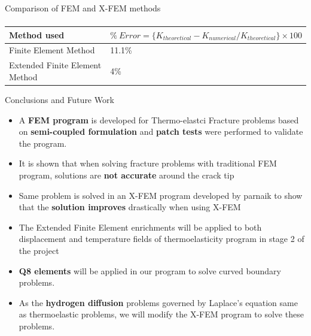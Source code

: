 \documentclass{beamer}
\begin{document}
\begin{frame}[t,fragile]{Comparison of FEM and X-FEM methods}
\begin{align*}
\end{align*}
\vspace{-28pt}
\bgroup
\def\arraystretch{2}  
\begin{table}[H]
    \centering
    \begin{tabular}{|C{3cm}|C{6cm}|}
\hline 
Method used& $\% \ Error= \{K_{theoretical}-K_{numerical}/K_{theoretical}\}\times 100$\\
\hline
 Finite Element Method & 11.1\%\\
\hline
 Extended Finite Element Method& 4\%\\
\hline
\end{tabular}
\label{table1}
\end{table}
\egroup
\end{frame} 
\begin{frame}[t,fragile]{Conclusions and Future Work}
    \vspace{-.2cm}
    \footnotesize
\begin{itemize}
         \item A \textbf{FEM program} is developed for Thermo-elastci Fracture problems based on \textbf{semi-coupled formulation} and \textbf{patch tests} were performed to validate the program.
       \item It is shown that when solving fracture problems with traditional FEM program, solutions are \textbf{not accurate} around the crack tip
        \item Same problem is solved in an X-FEM program developed by parnaik to show that the \textbf{solution improves} drastically when using X-FEM
       \item The Extended Finite Element enrichments will be applied to both displacement and temperature fields of thermoelasticity program in stage 2 of the project  
        \item \textbf{Q8 elements} will be applied in our program to solve curved boundary problems. 
        \item As the \textbf{hydrogen diffusion} problems governed by Laplace's equation same as thermoelastic problems, we will modify the X-FEM program to solve these problems. 
    \end{itemize}
\end{frame}
\end{document}
